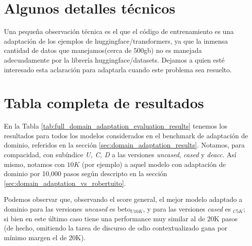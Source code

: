 
\section{Algunos detalles técnicos}

Una pequeña observación técnica es el que el código de entrenamiento es una adaptación de los ejemplos de huggingface/transformers, ya que la inmensa cantidad de datos que manejamos(cerca de 500gb) no es manejada adecuadamente por la librería huggingface/datasets. Dejamos a quien esté interesado esta aclaración para adaptarla cuando este problema sea resuelto.

\section{Tabla completa de resultados}



En la Tabla \ref{tab:full_domain_adaptation_evaluation_results} tenemos los resultados para todos los modelos considerados en el benchmark de adaptación de dominio, referidos en la sección \ref{sec:domain_adaptation_results}. Notamos, para compacidad, con subíndice \emph{U, C, D} a las versiones  \emph{uncased}, \emph{cased} y \emph{deacc}. Así mismo, notamos con $10K$ (por ejemplo) a aquel modelo con adaptación de dominio por 10,000 pasos según descripto en la sección \ref{sec:domain_adaptation_vs_robertuito}.

Podemos observar que, observando el score general, el mejor modelo adaptado a dominio para las versiones \emph{uncased} es beto$_{U10K}$, y para las versiones \emph{cased} es \beto{}$_{C5K}$; si bien en este último caso tiene una performance muy similar al de 20K pasos (de hecho, omitiendo la tarea de discurso de odio contextualizado gana por mínimo margen el de 20K).

